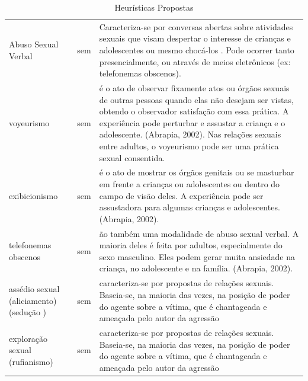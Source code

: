 \begin{table}[h]
\renewcommand\arraystretch{1.5}
\caption{Heurísticas Propostas}
\label{quadro:heuristicas}
\centering
\begin{tabular}{    
    |>{\centering\arraybackslash}m{\x}
    |>{\centering\arraybackslash}m{\y}
    |>{\arraybackslash}m{\z}|
    }
\cline{1-1}\cline{2-2}\cline{3-3}
    \multicolumn{1}{|p{\x}|}{\centering \textbf{Nome}} &
    \multicolumn{1}{p{\y}|}{\centering \textbf{Contato}} &
    \multicolumn{1}{p{\z}|}{\centering \textbf{Descrição}}
    \\
\cline{1-1}\cline{2-2}\cline{3-3}
    Abuso Sexual Verbal &
    sem &
    Caracteriza-se por conversas abertas sobre atividades sexuais que visam despertar o interesse de crianças e adolescentes ou mesmo chocá-los \cite{meurer2017direitos}. Pode ocorrer tanto presencialmente, ou através de meios eletrônicos (ex: telefonemas obscenos).
    \\
\cline{1-1}\cline{2-2}\cline{3-3}
    voyeurismo &
    sem &
    é o ato de observar fixamente atos ou órgãos sexuais de outras pessoas quando elas não desejam ser vistas, obtendo o observador satisfação com essa prática. A experiência pode perturbar e assustar a criança e o adolescente. (Abrapia, 2002). Nas relações sexuais entre adultos, o voyeurismo pode ser uma prática sexual consentida.
    \\
\cline{1-1}\cline{2-2}\cline{3-3}
    exibicionismo &
    sem &
    é o ato de mostrar os órgãos genitais ou se masturbar em frente a crianças ou adolescentes ou dentro do campo de visão deles. A experiência pode ser assustadora para algumas crianças e adolescentes. (Abrapia, 2002).
    \\
\cline{1-1}\cline{2-2}\cline{3-3}
    telefonemas obscenos &
    sem &
    ão também uma modalidade de abuso sexual verbal. A maioria deles é feita por adultos, especialmente do sexo masculino. Eles podem gerar muita ansiedade na criança, no adolescente e na família. (Abrapia, 2002).
    \\
\cline{1-1}\cline{2-2}\cline{3-3}
    assédio sexual (aliciamento) (sedução ) &
    sem &
    caracteriza-se por propostas de relações sexuais. Baseia-se, na maioria das vezes, na posição de poder do agente sobre a vítima, que é chantageada e ameaçada pelo autor da agressão
    \\
\cline{1-1}\cline{2-2}\cline{3-3}
    exploração sexual (rufianismo) &
    sem &
    caracteriza-se por propostas de relações sexuais. Baseia-se, na maioria das vezes, na posição de poder do agente sobre a vítima, que é chantageada e ameaçada pelo autor da agressão

\end{tabular}
\end{table}
